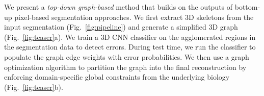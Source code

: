 %
%


We present a \textit{top-down graph-based} method that builds on the outputs of bottom-up pixel-based segmentation approaches. We first extract 3D skeletons from the input segmentation (Fig.~\ref{fig:pipeline}) and generate a simplified 3D graph (Fig.~\ref{fig:teaser}a). We train a 3D CNN classifier on the agglomerated regions in the segmentation data to detect errors. During test time, we run the classifier to populate the graph edge weights with error probabilities. We then use a graph optimization algorithm to partition the graph into the final reconstruction by enforcing domain-specific global constraints from the underlying biology (Fig.~\ref{fig:teaser}b).

